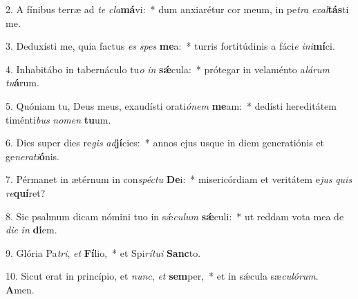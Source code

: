 2. A fínibus terræ ad \textit{te} \textit{cla}\textbf{má}vi:~*  dum anxiarétur cor meum, in pe\textit{tra} \textit{ex}\textit{al}\textbf{tás}ti me.\

3. Deduxísti me, quia factus \textit{es} \textit{spes} \textbf{me}a:~*  turris fortitúdinis a fáci\textit{e} \textit{in}\textit{i}\textbf{mí}ci.\

4. Inhabitábo in tabernáculo tu\textit{o} \textit{in} \textbf{sǽ}cula:~*  prótegar in velaménto a\textit{lá}\textit{rum} \textit{tu}\textbf{á}rum.\

5. Quóniam tu, Deus meus, exaudísti orati\textit{ó}\textit{nem} \textbf{me}am:~*  dedísti hereditátem timénti\textit{bus} \textit{no}\textit{men} \textbf{tu}um.\

6. Dies super dies re\textit{gis} \textit{ad}\textbf{jí}cies:~*  annos ejus usque in diem generatiónis et ge\textit{ne}\textit{ra}\textit{ti}\textbf{ó}nis.\

7. Pérmanet in ætérnum in con\textit{spéc}\textit{tu} \textbf{De}i:~*  misericórdiam et veritátem e\textit{jus} \textit{quis} \textit{re}\textbf{quí}ret?\

8. Sic psalmum dicam nómini tuo in sǽ\textit{cu}\textit{lum} \textbf{sǽ}culi:~*  ut reddam vota mea de \textit{di}\textit{e} \textit{in} \textbf{di}em.\

9. Glória Pa\textit{tri}, \textit{et} \textbf{Fí}lio,~*  et Spi\textit{rí}\textit{tu}\textit{i} \textbf{Sanc}to.\

10. Sicut erat in princípio, et \textit{nunc}, \textit{et} \textbf{sem}per,~*  et in sǽcula sæ\textit{cu}\textit{ló}\textit{rum}. \textbf{A}men.\

